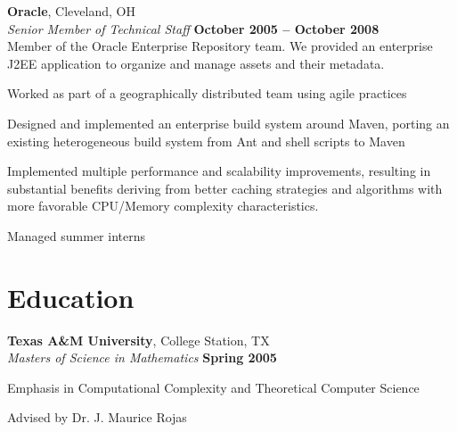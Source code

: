 \documentclass[margin,line,12pt]{resume}
\begin{document}
\begin{resume}
    \newpage
    \vspace*{1mm}
    
    \textbf{Oracle}, Cleveland, OH \vspace{2mm}\\\vspace{1mm}%
    \textsl{Senior Member of Technical Staff} \hfill \textbf{October 2005 -- October 2008}\\
    Member of the Oracle Enterprise Repository team.  We provided an enterprise J2EE application to organize and manage assets and their metadata. 
    \begin{list2}
    \item Worked as part of a geographically distributed team using agile practices
    \item Designed and implemented an enterprise build system around Maven, porting an existing heterogeneous build system from Ant and shell scripts to Maven
    \item Implemented multiple performance and scalability improvements, resulting in substantial benefits deriving from better caching strategies and algorithms with more favorable CPU/Memory complexity characteristics.
    \item Managed summer interns
    \end{list2}
  
    \section{\mysidestyle Education}

    \textbf{Texas A\&M University}, College Station, TX \vspace{2mm}\\\vspace{1mm}%
    \textsl{Masters of Science in Mathematics} \hfill \textbf{ Spring 2005}\vspace{-3mm}\\\vspace{-1mm}%
    \begin{list2}
        \item Emphasis in Computational Complexity and Theoretical Computer Science
        \item Advised by Dr. J. Maurice Rojas
    \end{list2}\vspace{-1.5mm}
    

\end{resume}
\end{document}
